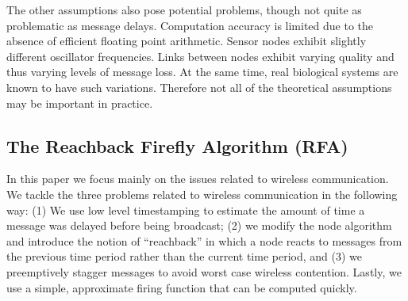The other assumptions also pose potential problems, though not quite
as problematic as message delays. Computation accuracy is limited due
to the absence of efficient floating point arithmetic.  Sensor nodes
exhibit slightly different oscillator frequencies. Links between nodes
exhibit varying quality and thus varying levels of message loss. At
the same time, real biological systems are known to have such
variations. Therefore not all of the theoretical assumptions may be
important in practice.



\subsection{The Reachback Firefly Algorithm (RFA)}

In this paper we focus mainly on the issues related to wireless
communication. We tackle the three problems related to wireless
communication in the following way: (1) We use low level timestamping
to estimate the amount of time a message was delayed before being
broadcast; (2) we modify the node algorithm and introduce the notion
of ``reachback'' in which a node reacts to messages from the previous
time period rather than the current time period, and (3) we
preemptively stagger messages to avoid worst case wireless contention.
Lastly, we use a simple, approximate firing function that can be
computed quickly.

